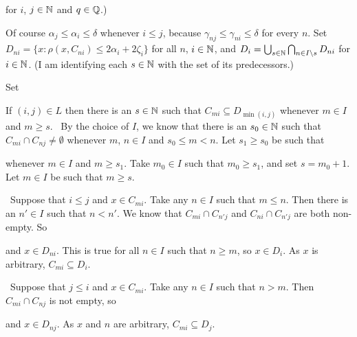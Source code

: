 {\noindent for $i$, $j\in\Bbb N$ and $q\in\Bbb Q$.)

Of course $\alpha_j\le\alpha_i\le\delta$ whenever
$i\le j$, because $\gamma_{nj}\le\gamma_{ni}\le\delta$ for
every $n$.   Set $D_{ni}=\{x:\rho(x,C_{ni})\le 2\alpha_i+2\zeta_i\}$ for
all $n$, $i\in\Bbb N$, and
$D_i=\bigcup_{s\in\Bbb N}\bigcap_{n\in I\setminus s}D_{ni}$ for
$i\in\Bbb N$.   (I am identifying each $s\in\Bbb N$ with the set of its
predecessors.)

\medskip

 Set


\noindent If $(i,j)\in L$ then there is an $s\in\Bbb N$ such that
$C_{mi}\subseteq D_{\min(i,j)}$ whenever $m\in I$ and
$m\ge s$.   \Prf\ By the choice of $I$, we know that there is an
$s_0\in\Bbb N$ such
that $C_{mi}\cap C_{nj}\ne\emptyset$ whenever $m$, $n\in I$ and
$s_0\le m<n$.   Let $s_1\ge s_0$ be such that


\noindent whenever $m\in I$ and $m\ge s_1$.   Take $m_0\in I$ such that
$m_0\ge s_1$, and set $s=m_0+1$.   Let $m\in I$ be such that $m\ge s$.

\medskip

\qquad\grheada\ Suppose that $i\le j$ and $x\in C_{mi}$.   Take any
$n\in I$ such that $m\le n$.   Then there is an $n'\in I$ such that
$n<n'$.   We know that
$C_{mi}\cap C_{n'j}$ and $C_{ni}\cap C_{n'j}$ are both non-empty.   So


\noindent and $x\in D_{ni}$.   This is true for all $n\in I$ such that
$n\ge m$, so $x\in D_i$.   As $x$ is arbitrary, $C_{mi}\subseteq D_i$.

\medskip

\qquad\grheadb\ Suppose that $j\le i$ and $x\in C_{mi}$.   Take any
$n\in I$ such that $n>m$.   Then $C_{mi}\cap C_{nj}$ is not empty, so


\noindent and $x\in D_{nj}$.   As $x$ and $n$ are arbitrary,
$C_{mi}\subseteq D_j$.

}
